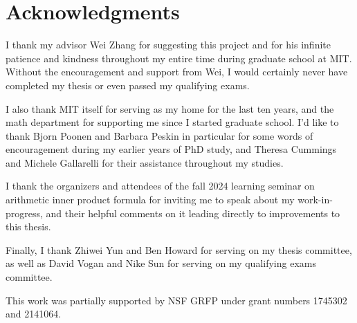 

\chapter*{Acknowledgments}

I thank my advisor Wei Zhang for suggesting this project
and for his infinite patience and kindness
throughout my entire time during graduate school at MIT.
Without the encouragement and support from Wei,
I would certainly never have completed my thesis or even passed my qualifying exams.

I also thank MIT itself for serving as my home for the last ten years,
and the math department for supporting me since I started graduate school.
I'd like to thank Bjorn Poonen and Barbara Peskin in particular
for some words of encouragement during my earlier years of PhD study,
and Theresa Cummings and Michele Gallarelli for their assistance throughout my studies.

I thank the organizers and attendees of the fall 2024
learning seminar on arithmetic inner product formula
for inviting me to speak about my work-in-progress, and their helpful comments on it
leading directly to improvements to this thesis.

Finally, I thank Zhiwei Yun and Ben Howard for serving on my thesis committee,
as well as David Vogan and Nike Sun for serving on my qualifying exams committee.

This work was partially supported by NSF GRFP under grant numbers 1745302 and 2141064.
